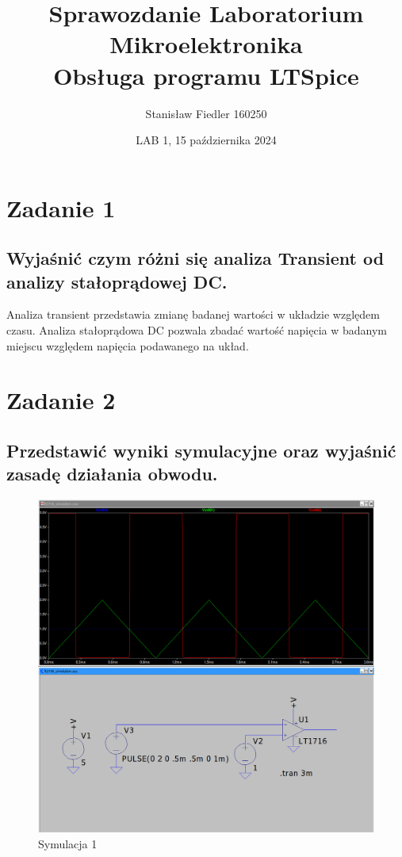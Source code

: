 \documentclass[a4paper, 11pt]{article}
\title{%
       \large Sprawozdanie Laboratorium Mikroelektronika \\
       \huge Obsługa programu LTSpice}
\author{Stanisław Fiedler 160250}
\date{LAB 1, 15 października 2024}
\begin{document}
\maketitle
\tableofcontents

\section{Zadanie 1}

\subsection{Wyjaśnić czym różni się analiza Transient od analizy stałoprądowej DC.}\label{sub:1.1} %

Analiza transient przedstawia zmianę badanej wartości w układzie względem czasu. Analiza stałoprądowa DC pozwala zbadać wartość napięcia w badanym miejscu względem napięcia podawanego na układ.


\pagebreak

\section{Zadanie 2}

\subsection{Przedstawić wyniki symulacyjne oraz wyjaśnić zasadę działania obwodu.}\label{sub:2.1} %

\begin{figure}[h]
	\centering
	\includegraphics[scale = 0.25]{images/21_simulation.png}
	\caption{Symulacja 1}
	\label{fig:sim1}
\end{figure}
\end{document}
